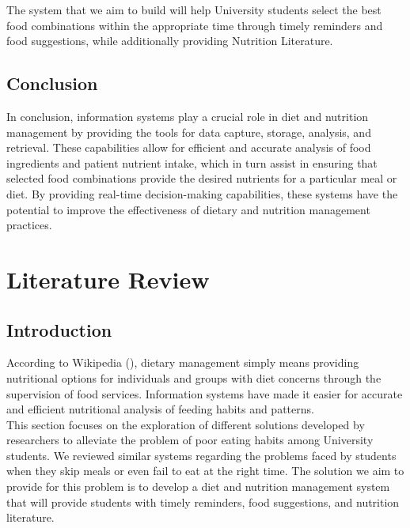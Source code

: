 \documentclass {article}
\begin{document}
\noindent The system that we aim to build will help University students select the best food combinations within the appropriate time through timely reminders and food suggestions, while additionally providing Nutrition Literature.

\subsection{Conclusion}
\noindent In conclusion, information systems play a crucial role in diet and nutrition management by providing the tools for data capture, storage, analysis, and retrieval. These capabilities allow for efficient and accurate analysis of food ingredients and patient nutrient intake, which in turn assist in ensuring that selected food combinations provide the desired nutrients for a particular meal or diet. By providing real-time decision-making capabilities, these systems have the potential to improve the effectiveness of dietary and nutrition management practices.

\newpage
\section{Literature Review}

\subsection{Introduction}
\noindent According to Wikipedia (\citeyear{wikipedia2019dietary}), dietary management simply means providing nutritional options for individuals and groups with diet concerns through the supervision of food services. Information systems have made it easier for accurate and efficient nutritional analysis of feeding habits and patterns.\\

\noindent This section focuses on the exploration of different solutions developed by researchers to alleviate the problem of poor eating habits among University students. We reviewed similar systems regarding the problems faced by students when they skip meals or even fail to eat at the right time. The solution we aim to provide for this problem is to develop a diet and nutrition management system that will provide students with timely reminders, food suggestions, and nutrition literature.\\
\end{document}
